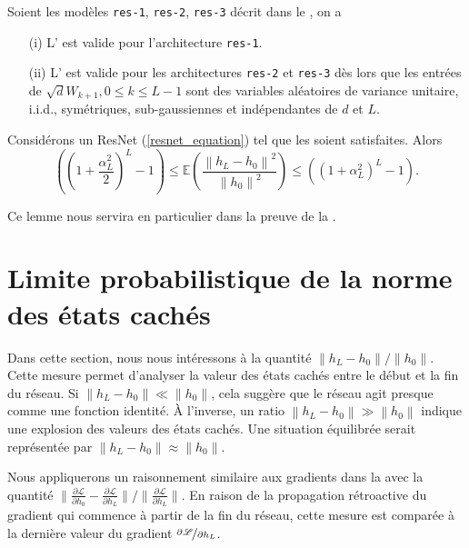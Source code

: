 \begin{proposition}[Admis]\label{prop1}
    Soient les modèles \texttt{res-1}, \texttt{res-2}, \texttt{res-3} décrit dans le , on a 
    \begin{itemize}
        \item [(i)] L' est valide pour l'architecture \texttt{res-1}.
        \item [(ii)] L' est valide pour les architectures \texttt{res-2} et \texttt{res-3} dès lors que les entrées de $ \sqrt{d}W_{k+1}, 0 \leqslant k \leqslant L-1 $ sont des variables aléatoires de variance unitaire, i.i.d., symétriques, sub-gaussiennes et indépendantes de $ d $ et $ L $.
    \end{itemize}
\end{proposition}

\begin{lem}[Admis]\label{lem14}
    Considérons un ResNet (\ref{resnet_equation}) tel que les  soient satisfaites. Alors
    \[
        \left(\left(1 + \frac{\alpha _L ^2 }{2 }\right) ^L - 1\right) \leqslant \mathbb{E}\left( \frac{\left\| h_L - h_0 \right\| ^2 }{\left\| h_0 \right\| ^2} \right) \leqslant \left(\left(1 + \alpha _L ^2 \right) ^L - 1 \right)
    .\]
\end{lem}
Ce lemme nous servira en particulier dans la preuve de la .

\section{Limite probabilistique de la norme des états cachés}

Dans cette section, nous nous intéressons à la quantité $ {\left\| h_L - h_0 \right\|} / {\left\| h_0 \right\|}$. Cette mesure permet d'analyser la valeur des états cachés entre le début et la fin du réseau. Si $\left\| h_L - h_0 \right\| \ll \left\| h_0 \right\|$, cela suggère que le réseau agit presque comme une fonction identité. À l'inverse, un ratio $\left\| h_L - h_0 \right\| \gg \left\| h_0 \right\|$ indique une explosion des valeurs des états cachés. Une situation équilibrée serait représentée par $\left\| h_L - h_0 \right\| \approx \left\| h_0 \right\|$.

Nous appliquerons un raisonnement similaire aux gradients dans la  avec la quantité ${\| \frac{\partial \mathscr{L}}{\partial h_0} - \frac{\partial \mathscr{L}}{\partial h_L} \|} / {\| \frac{\partial \mathscr{L}}{\partial h_L} \|}$. En raison de la propagation rétroactive du gradient qui commence à partir de la fin du réseau, cette mesure est comparée à la dernière valeur du gradient $\nicefrac{\partial \mathscr{L}}{\partial h_L}$.

